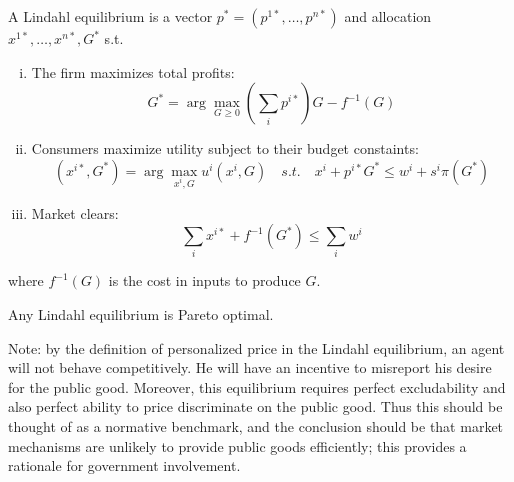 \begin{definition}
  A Lindahl equilibrium is a vector $p^* = (p^{1*}, \dots, p^{n*})$
  and allocation $x^{1*}, \dots, x^{n*}, G^*$ s.t.
  \begin{enumerate}[(i)]
  \item The firm maximizes total profits:
    \[
    G^* = \arg \max_{G \geq 0} \left(\sum_i p^{i*}\right)G - f^{-1}(G)
    \]
  \item Consumers maximize utility subject to their budget constaints:
    \[
    (x^{i*}, G^*) = \arg \max_{x^i, G} u^i(x^i, G)
    \quad s.t. \quad  x^i + p^{i*}G^* \leq w^i + s^i \pi(G^*) 
    \]
  \item Market clears:
    \[
    \sum_i x^{i*} + f^{-1}(G^*) \leq \sum_i w^i
    \]
  \end{enumerate}
  where $f^{-1}(G)$ is the cost in inputs to produce $G$.

\end{definition}

\begin{prop}
  Any Lindahl equilibrium is Pareto optimal.
\end{prop}

Note: by the definition of personalized price in the Lindahl
equilibrium, an agent will not behave competitively. He will have an
incentive to misreport his desire for the public good. Moreover, this
equilibrium requires perfect excludability and also perfect ability to
price discriminate on the public good. Thus this should be thought of
as a normative benchmark, and the conclusion should be that market
mechanisms are unlikely to provide public goods efficiently; this
provides a rationale for government involvement.
